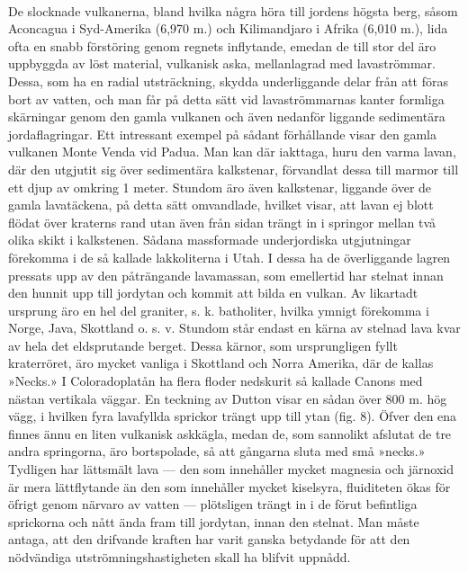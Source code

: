 \documentclass[a4paper, 12pt, oneside, swedish]{article}
\begin{document}
\paragraph{}
De slocknade vulkanerna, bland hvilka några höra till jordens högsta berg, såsom Aconcagua i Syd-Amerika (6,970 m.) och Kilimandjaro i Afrika (6,010 m.), lida ofta en snabb förstöring genom regnets inflytande, emedan de till stor del äro uppbyggda av löst material, vulkanisk aska, mellanlagrad med lavaströmmar. Dessa, som ha en radial utsträckning, skydda underliggande delar från att föras bort av vatten, och man får på detta sätt vid lavaströmmarnas kanter formliga skärningar genom den gamla vulkanen och även nedanför liggande sedimentära jordaflagringar. Ett intressant exempel på sådant förhållande visar den gamla vulkanen Monte Venda vid Padua. Man kan där iakttaga, huru den varma lavan, där den utgjutit sig över sedimentära kalkstenar, förvandlat dessa till marmor till ett djup av omkring 1 meter. Stundom äro även kalkstenar, liggande över de gamla lavatäckena, på detta sätt omvandlade, hvilket visar, att lavan ej blott flödat över kraterns rand utan även från sidan trängt in i springor mellan två olika skikt i kalkstenen. Sådana massformade underjordiska utgjutningar förekomma i de så kallade lakkoliterna i Utah. I dessa ha de överliggande lagren pressats upp av den påträngande lavamassan, som emellertid har stelnat innan den hunnit upp till jordytan och kommit att bilda en vulkan. Av likartadt ursprung äro en hel del graniter, s. k. batholiter, hvilka ymnigt förekomma i Norge, Java, Skottland o. s. v. Stundom står endast en kärna av stelnad lava kvar av hela det eldsprutande berget. Dessa kärnor, som ursprungligen fyllt kraterröret, äro mycket vanliga i Skottland och Norra Amerika, där de kallas »Necks.» I Coloradoplatån ha flera floder nedskurit så kallade Canons med nästan vertikala väggar. En teckning av Dutton visar en sådan över 800 m. hög vägg, i hvilken fyra lavafyllda sprickor trängt upp till ytan (fig. 8). Öfver den ena finnes ännu en liten vulkanisk askkägla, medan de, som sannolikt afslutat de tre andra springorna, äro bortspolade, så att gångarna sluta med små »necks.» Tydligen har lättsmält lava --- den som innehåller mycket magnesia och järnoxid är mera lättflytande än den som innehåller mycket kiselsyra, fluiditeten ökas för öfrigt genom närvaro av vatten --- plötsligen trängt in i de förut befintliga sprickorna och nått ända fram till jordytan, innan den stelnat. Man måste antaga, att den drifvande kraften har varit ganska betydande för att den nödvändiga utströmningshastigheten skall ha blifvit uppnådd.
\end{document}
